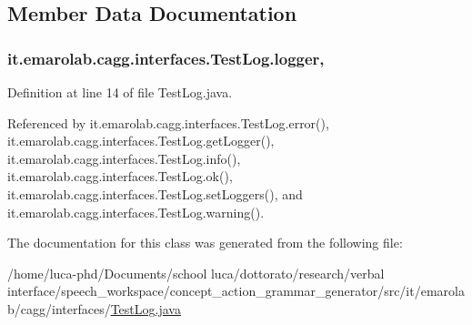 \subsection{Member Data Documentation}
\hypertarget{classit_1_1emarolab_1_1cagg_1_1interfaces_1_1TestLog_a2ff47554fb18b3c452d1c5150b387674}{
\subsubsection[{logger}]{ it.\-emarolab.\-cagg.\-interfaces.\-Test\-Log.\-logger\hspace{0.3cm}{\ttfamily [static]}, {\ttfamily [private]}}}\label{classit_1_1emarolab_1_1cagg_1_1interfaces_1_1TestLog_a2ff47554fb18b3c452d1c5150b387674}


Definition at line 14 of file Test\-Log.\-java.



Referenced by it.\-emarolab.\-cagg.\-interfaces.\-Test\-Log.\-error(), it.\-emarolab.\-cagg.\-interfaces.\-Test\-Log.\-get\-Logger(), it.\-emarolab.\-cagg.\-interfaces.\-Test\-Log.\-info(), it.\-emarolab.\-cagg.\-interfaces.\-Test\-Log.\-ok(), it.\-emarolab.\-cagg.\-interfaces.\-Test\-Log.\-set\-Loggers(), and it.\-emarolab.\-cagg.\-interfaces.\-Test\-Log.\-warning().



The documentation for this class was generated from the following file\-:\begin{DoxyCompactItemize}
\item 
/home/luca-\/phd/\-Documents/school luca/dottorato/research/verbal interface/speech\-\_\-workspace/concept\-\_\-action\-\_\-grammar\-\_\-generator/src/it/emarolab/cagg/interfaces/\hyperlink{TestLog_8java}{Test\-Log.\-java}\end{DoxyCompactItemize}
